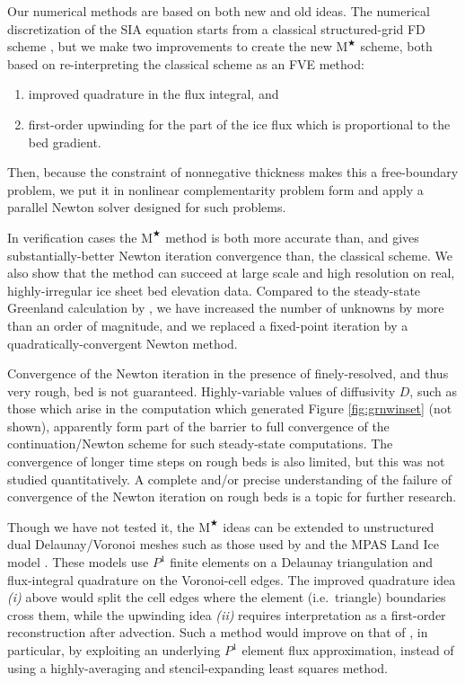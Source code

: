 \documentclass[twocolumn,letterpaper]{igs}
\newcommand{\Mstar}{$\text{M}^{\bigstar}$\xspace}
\begin{document}
Our numerical methods are based on both new and old ideas.  The numerical discretization of the SIA equation starts from a classical structured-grid FD scheme \citep{Mahaffy1976}, but we make two improvements to create the new \Mstar scheme, both based on re-interpreting the classical scheme as an FVE method:
\renewcommand{\labelenumi}{\emph{(\roman{enumi})}}
\begin{enumerate}
\item improved quadrature in the flux integral, and
\item first-order upwinding for the part of the ice flux which is proportional to the bed gradient.
\end{enumerate}
Then, because the constraint of nonnegative thickness makes this a free-boundary problem, we put it in nonlinear complementarity problem form and apply a parallel Newton solver designed for such problems.

In verification cases the \Mstar method is both more accurate than, and gives substantially-better Newton iteration convergence than, the classical scheme.  We also show that the method can succeed at large scale and high resolution on real, highly-irregular ice sheet bed elevation data.  Compared to the steady-state Greenland calculation by \cite{JouvetBueler2012}, we have increased the number of unknowns by more than an order of magnitude, and we replaced a fixed-point iteration by a quadratically-convergent Newton method.

Convergence of the Newton iteration in the presence of finely-resolved, and thus very rough, bed is not guaranteed.  Highly-variable values of diffusivity $D$, such as those which arise in the computation which generated Figure \ref{fig:grnwinset} (not shown), apparently form part of the barrier to full convergence of the continuation/Newton scheme for such steady-state computations.  The convergence of longer time steps on rough beds is also limited, but this was not studied quantitatively.  A complete and/or precise understanding of the failure of convergence of the Newton iteration on rough beds is a topic for further research.

Though we have not tested it, the \Mstar ideas can be extended to unstructured dual Delaunay/Voronoi meshes such as those used by \cite{EgholmNielsen2010} and the MPAS Land Ice model \citep{MPASLandIce2013,Ringleretal2013}.  These models use $P^1$ finite elements on a Delaunay triangulation and flux-integral quadrature on the Voronoi-cell edges.  The improved quadrature idea \emph{(i)} above would split the cell edges where the element (i.e.~triangle) boundaries cross them, while the upwinding idea \emph{(ii)} requires interpretation as a first-order reconstruction after advection.  Such a method would improve on that of \cite{EgholmNielsen2010}, in particular, by exploiting an underlying $P^1$ element flux approximation, instead of using a highly-averaging and stencil-expanding least squares method.
\end{document}
